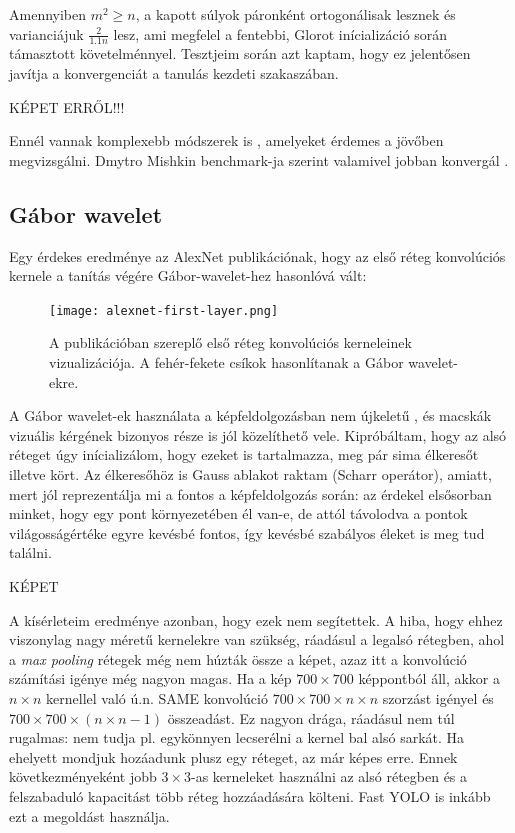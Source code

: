 \documentclass{article}
\begin{document}
Amennyiben $m^2 \ge n$, a kapott súlyok páronként ortogonálisak lesznek és varianciájuk $\frac{2}{1.1n}$ lesz, ami megfelel a fentebbi, Glorot inícializáció során támasztott követelménnyel. Tesztjeim során azt kaptam, hogy ez jelentősen javítja a konvergenciát a tanulás kezdeti szakaszában.

KÉPET ERRŐL!!!

Ennél vannak komplexebb módszerek is \cite{mishkin2015all}, amelyeket érdemes a jövőben megvizsgálni. Dmytro Mishkin benchmark-ja szerint valamivel jobban konvergál \cite{ducha-aiki-caffenet-batch-norm-benchmark}.


\subsection{Gábor wavelet}

Egy érdekes eredménye az AlexNet publikációnak\cite{krizhevsky2012imagenet}, hogy az első réteg konvolúciós kernele a tanítás végére Gábor-wavelet-hez hasonlóvá vált:

\begin{figure}[h!]
    \centering
    \texttt{[image: alexnet-first-layer.png]}
    \caption{A publikációban szereplő első réteg konvolúciós kerneleinek vizualizációja. A fehér-fekete csíkok hasonlítanak a Gábor wavelet-ekre.}
    \label{fig:difficult_example}
\end{figure}

A Gábor wavelet-ek használata a képfeldolgozásban nem újkeletű \cite{541406}, és macskák vizuális kérgének bizonyos része is jól közelíthető vele. Kipróbáltam, hogy az alsó réteget úgy inícializálom, hogy ezeket is tartalmazza, meg pár sima élkeresőt illetve kört. Az élkeresőhöz is Gauss ablakot raktam (Scharr operátor), amiatt, mert jól reprezentálja mi a fontos a képfeldolgozás során: az érdekel elsősorban minket, hogy egy pont környezetében él van-e, de attól távolodva a pontok világosságértéke egyre kevésbé fontos, így kevésbé szabályos éleket is meg tud találni.

KÉPET

A kísérleteim eredménye azonban, hogy ezek nem segítettek. A hiba, hogy ehhez viszonylag nagy méretű kernelekre van szükség, ráadásul a legalsó rétegben, ahol a \textit{max pooling} rétegek még nem húzták össze a képet, azaz itt a konvolúció számítási igénye még nagyon magas. Ha a kép $700 \times 700$ képpontból áll, akkor a $n \times n$ kernellel való ú.n. SAME konvolúció $700 \times 700 \times n \times n$ szorzást igényel és $700 \times 700 \times (n \times n - 1)$ összeadást. Ez nagyon drága, ráadásul nem túl rugalmas: nem tudja pl. egykönnyen lecserélni a kernel bal alsó sarkát. Ha ehelyett mondjuk hozáadunk plusz egy réteget, az már képes erre. Ennek következményeként jobb $3 \times 3$-as kerneleket használni az alsó rétegben és a felszabaduló kapacitást több réteg hozzáadására költeni. Fast YOLO \cite{redmon2016you} is inkább ezt a megoldást használja.
\end{document}
